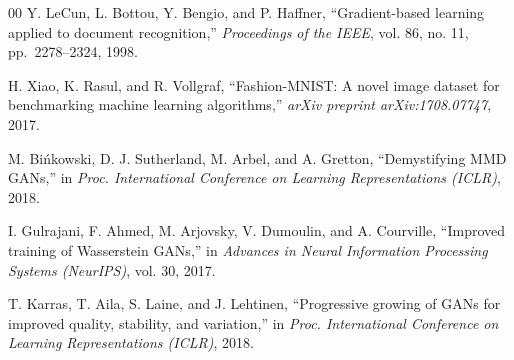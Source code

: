 \documentclass[conference]{IEEEtran}
\begin{document}
\begin{thebibliography}{00}
Y. LeCun, L. Bottou, Y. Bengio, and P. Haffner,
``Gradient-based learning applied to document recognition,''
\textit{Proceedings of the IEEE}, vol. 86, no. 11, pp.\ 2278--2324, 1998.

H. Xiao, K. Rasul, and R. Vollgraf,
``Fashion-MNIST: A novel image dataset for benchmarking machine learning algorithms,''
\textit{arXiv preprint arXiv:1708.07747}, 2017.

M. Bi\'{n}kowski, D. J. Sutherland, M. Arbel, and A. Gretton,
``Demystifying MMD GANs,''
in \textit{Proc. International Conference on Learning Representations (ICLR)}, 2018.

I. Gulrajani, F. Ahmed, M. Arjovsky, V. Dumoulin, and A. Courville,
``Improved training of Wasserstein GANs,''
in \textit{Advances in Neural Information Processing Systems (NeurIPS)}, vol. 30, 2017.

T. Karras, T. Aila, S. Laine, and J. Lehtinen,
``Progressive growing of GANs for improved quality, stability, and variation,''
in \textit{Proc. International Conference on Learning Representations (ICLR)}, 2018.

\end{thebibliography}
\end{document}
